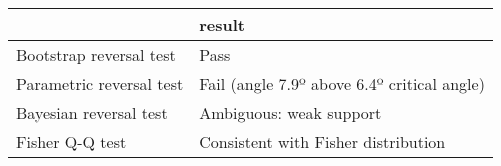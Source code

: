 \begin{tabular}{ll}
\toprule
{} &                                       result \\
\midrule
Bootstrap reversal test  &                                         Pass \\
Parametric reversal test &  Fail (angle 7.9º above 6.4º critical angle) \\
Bayesian reversal test   &                      Ambiguous: weak support \\
Fisher Q-Q test          &          Consistent with Fisher distribution \\
\bottomrule
\end{tabular}
